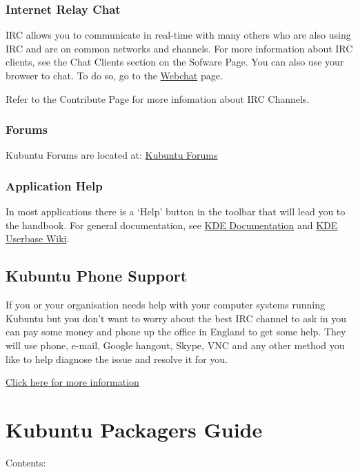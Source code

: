 \documentclass[letterpaper,10pt,english]{sphinxmanual}
\begin{document}
\subsection{Internet Relay Chat}
\label{\detokenize{docs/support:internet-relay-chat}}
IRC allows you to communicate in real-time with many others who are also using IRC and are on common networks and channels. For more information about IRC clients, see the Chat Clients section on the Sofware Page. You can also use your browser to chat. To do so, go to the \href{http://webchat.freenode.net/}{Webchat} page.

Refer to the Contribute Page for more infomation about IRC Channels.


\subsection{Forums}
\label{\detokenize{docs/support:forums}}
Kubuntu Forums are located at: \href{https://www.kubuntuforums.net/content.php}{Kubuntu Forums}


\subsection{Application Help}
\label{\detokenize{docs/support:application-help}}
In most  applications there is a `Help' button in the toolbar that will lead you to the handbook. For general  documentation, see \href{https://www.kde.org/documentation/}{KDE Documentation} and \href{https://userbase.kde.org/Special:MyLanguage/Welcome\_to\_KDE\_UserBase}{KDE Userbase Wiki}.


\section{Kubuntu Phone Support}
\label{\detokenize{docs/support:kubuntu-phone-support}}
If you or your organisation needs help with your computer systems running Kubuntu but you don't want to worry about the best IRC channel to ask in you can pay some money and phone up the office in England to get some help. They will use phone, e-mail, Google hangout, Skype, VNC and any other method you like to help diagnose the issue and resolve it for you.

\href{http://kubuntu.emerge-open.com/buy}{Click here for more information}


\chapter{Kubuntu Packagers Guide}
\label{\detokenize{docs/packaging_guide/packaging:kubuntu-packagers-guide}}\label{\detokenize{docs/packaging_guide/packaging::doc}}
Contents:
\end{document}
